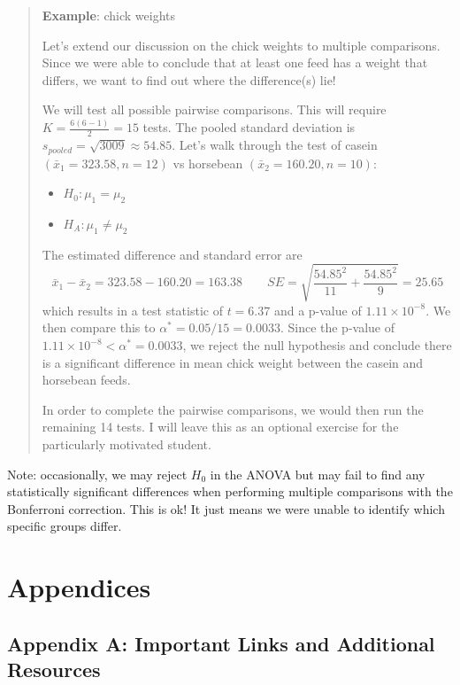 \documentclass[
]{book}
\providecommand{\tightlist}{%
  \setlength{\itemsep}{0pt}\setlength{\parskip}{0pt}}
\begin{document}
\begin{quote}
\textbf{Example}: chick weights

Let's extend our discussion on the chick weights to multiple comparisons. Since we were able to conclude that at least one feed has a weight that differs, we want to find out where the difference(s) lie!

We will test all possible pairwise comparisons. This will require \(K = \frac{6(6-1)}{2} = 15\) tests. The pooled standard deviation is \(s_{pooled} = \sqrt{3009} \approx 54.85\). Let's walk through the test of casein \((\bar{x}_1 = 323.58, n=12)\) vs horsebean \((\bar{x}_2 = 160.20, n=10)\):

\begin{itemize}
\tightlist
\item
  \(H_0: \mu_1 = \mu_2\)
\item
  \(H_A: \mu_1 \ne \mu_2\)
\end{itemize}

The estimated difference and standard error are \[\bar{x}_1 - \bar{x}_2 = 323.58 - 160.20 = 163.38 \quad\quad SE = \sqrt{\frac{54.85^2}{11}+\frac{54.85^2}{9}} = 25.65\] which results in a test statistic of \(t=6.37\) and a p-value of \(1.11\times10^{-8}\). We then compare this to \(\alpha^* = 0.05/15 = 0.0033\). Since the p-value of \(1.11\times10^{-8} < \alpha^* = 0.0033\), we reject the null hypothesis and conclude there is a significant difference in mean chick weight between the casein and horsebean feeds.

In order to complete the pairwise comparisons, we would then run the remaining 14 tests. I will leave this as an optional exercise for the particularly motivated student.
\end{quote}

Note: occasionally, we may reject \(H_0\) in the ANOVA but may fail to find any statistically significant differences when performing multiple comparisons with the Bonferroni correction. This is ok! It just means we were unable to identify which specific groups differ.

\chapter*{Appendices}\label{appendices}

\section*{Appendix A: Important Links and Additional Resources}\label{appendix-a-important-links-and-additional-resources}
\end{document}
